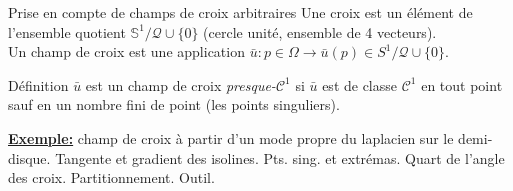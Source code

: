 \documentclass[compress,10pt,aspectratio=169]{beamer}
\begin{document}
\begin{frame}{Prise en compte de champs de croix arbitraires}
\small
Une {\color{onera}croix} est un élément de l'ensemble quotient $\mathbb{S}^1/\mathcal{Q}\cup\{0\}$ {\color{onera_gray}(cercle unité, ensemble de 4 vecteurs)}.\\\vspace{0.2cm}
Un {\color{onera}champ de croix} est une application $\bar{u}:p\in\Omega\rightarrow \bar{u}(p)\in S^1/\mathcal{Q}\cup\{0\}$.\\\vspace{0.2cm}

\begin{onerablock}{\small Définition}
\small
$\bar{u}$ est un champ de croix \emph{presque-$\mathcal{C}^1$} si $\bar{u}$ est de classe $\mathcal{C}^1$ en tout point sauf en un nombre fini de point {\color{onera_gray}(les points singuliers)}.
\end{onerablock}

{\bf\underline{Exemple:}} {\color{onera_gray} champ de croix à partir d'un mode propre du laplacien sur le demi-disque. Tangente et gradient des isolines. Pts. sing. et extrémas. Quart de l'angle des croix. Partitionnement. Outil.}




\end{frame}
\end{document}
